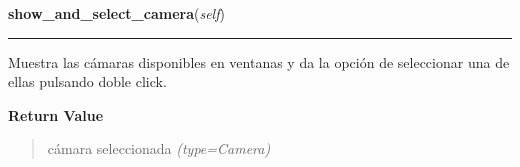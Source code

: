 \hspace{.8\funcindent}\begin{boxedminipage}{\funcwidth}

    \raggedright \textbf{show\_and\_select\_camera}(\textit{self})

    \vspace{-1.5ex}

    \rule{\textwidth}{0.5\fboxrule}
\setlength{\parskip}{2ex}
Muestra las cámaras disponibles en ventanas y da la opción de seleccionar una de ellas pulsando doble click.

\setlength{\parskip}{1ex}
      \textbf{Return Value}
    \vspace{-1ex}

      \begin{quote}

cámara seleccionada
      {\it (type=Camera)}

      \end{quote}

    \end{boxedminipage}

